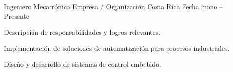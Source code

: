 
\begin{cventries}

  \cventry
    {Ingeniero Mecatrónico}
    {Empresa / Organización}
    {Costa Rica}
    {Fecha inicio -- Presente}
    {
      \begin{cvitems}
        \item {Descripción de responsabilidades y logros relevantes.}
        \item {Implementación de soluciones de automatización para procesos industriales.}
        \item {Diseño y desarrollo de sistemas de control embebido.}
      \end{cvitems}
    }

\end{cventries}
